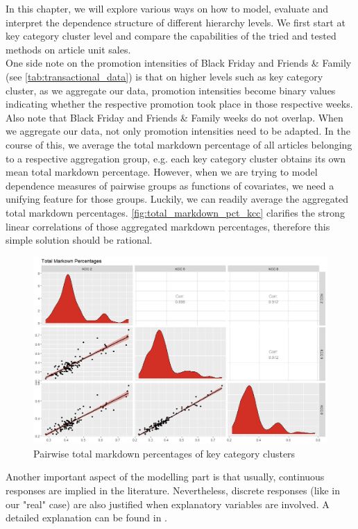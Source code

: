 
In this chapter, we will explore various ways on how to model, evaluate and interpret the dependence structure of different hierarchy levels. We first start at key category cluster level and compare the capabilities of the tried and tested methods on article unit sales. \\

One side note on the promotion intensities of Black Friday and Friends \& Family (see \autoref{tab:transactional_data}) is that on higher levels such as key category cluster, as we aggregate our data, promotion intensities become binary values indicating whether the respective promotion took place in those respective weeks. Also note that Black Friday and Friends \& Family weeks do not overlap. When we aggregate our data, not only promotion intensities need to be adapted. In the course of this, we average the total markdown percentage of all articles belonging to a respective aggregation group, e.g. each key category cluster obtains its own mean total markdown percentage. However, when we are trying to model dependence measures of pairwise groups as functions of covariates, we need a unifying feature for those groups. Luckily, we can readily average the aggregated total markdown percentages. \autoref{fig:total_markdown_pct_kcc} clarifies the strong linear correlations of those aggregated markdown percentages, therefore this simple solution should be rational. \\


\begin{figure}[H]
\centering
  \includegraphics[width=0.8\linewidth]{figures/total_markdown_pct_kcc.png}
  \caption{Pairwise total markdown percentages of key category clusters}
  \label{fig:total_markdown_pct_kcc}
\end{figure}

Another important aspect of the modelling part is that usually, continuous responses are implied in the literature. Nevertheless, discrete responses (like in our "real" case) are also justified when explanatory variables are involved. A detailed explanation can be found in \cite{trivedi2017note}.


